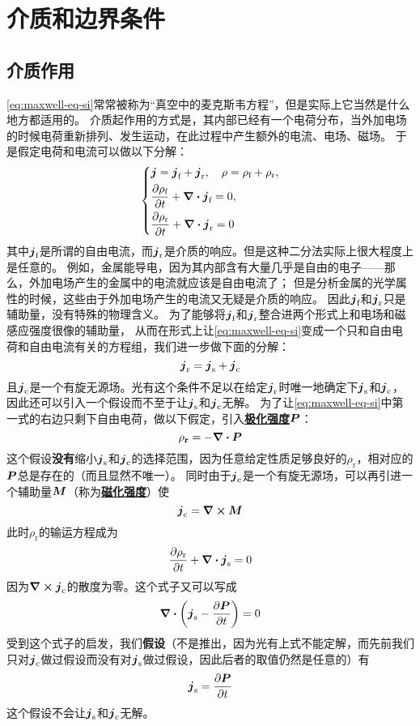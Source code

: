 \documentclass[UTF8, a4paper]{ctexart}
\renewcommand{\emph}[1]{\textbf{#1}}
\newcommand*{\concept}[1]{\underline{\textbf{#1}}}
\begin{document}
\section{介质和边界条件}

\subsection{介质作用}

\eqref{eq:maxwell-eq-si}常常被称为“真空中的麦克斯韦方程”，但是实际上它当然是什么地方都适用的。
介质起作用的方式是，其内部已经有一个电荷分布，当外加电场的时候电荷重新排列、发生运动，在此过程中产生额外的电流、电场、磁场。
于是假定电荷和电流可以做以下分解：
\[
    \left\{
        \begin{aligned}
            &\vb*{j} = \vb*{j}_\text{f} + \vb*{j}_\text{r}, \quad \rho = \rho_\text{f} + \rho_\text{r}, \\
            &\pdv{\rho_\text{f}}{t} + \div{\vb*{j}_\text{f}} = 0, \\
            &\pdv{\rho_\text{r}}{t} + \div{\vb*{j}_\text{r}} = 0
        \end{aligned}
    \right.
\]
其中$\vb*{j}_\text{f}$是所谓的自由电流，而$\vb*{j}_\text{r}$是介质的响应。但是这种二分法实际上很大程度上是任意的。
例如，金属能导电，因为其内部含有大量几乎是自由的电子——那么，外加电场产生的金属中的电流就应该是自由电流了；
但是分析金属的光学属性的时候，这些由于外加电场产生的电流又无疑是介质的响应。
因此$\vb*{j}_\text{f}$和$\vb*{j}_\text{r}$只是辅助量，没有特殊的物理含义。
为了能够将$\vb*{j}_\text{f}$和$\vb*{j}_\text{r}$整合进两个形式上和电场和磁感应强度很像的辅助量，
从而在形式上让\eqref{eq:maxwell-eq-si}变成一个只和自由电荷和自由电流有关的方程组，我们进一步做下面的分解：
\[
    \vb*{j}_\text{r} = \vb*{j}_\text{s} + \vb*{j}_\text{c}
\]
且$\vb*{j}_\text{c}$是一个有旋无源场。光有这个条件不足以在给定$\vb*{j}_\text{r}$时唯一地确定下$\vb*{j}_\text{s}$和$\vb*{j}_\text{c}$，
因此还可以引入一个假设而不至于让$\vb*{j}_\text{s}$和$\vb*{j}_\text{c}$无解。
为了让\eqref{eq:maxwell-eq-si}中第一式的右边只剩下自由电荷，做以下假定，引入\concept{极化强度}$\vb*{P}$：
\[
    \rho_\textbf{r} = - \div{\vb*{P}}
\]
这个假设\emph{没有}缩小$\vb*{j}_\text{s}$和$\vb*{j}_\text{c}$的选择范围，因为任意给定性质足够良好的$\rho_\text{r}$，相对应的$\vb*{P}$总是存在的（而且显然不唯一）。
同时由于$\vb*{j}_\text{c}$是一个有旋无源场，可以再引进一个辅助量$\vb*{M}$（称为\concept{磁化强度}）使
\[
    \vb*{j}_\text{c} = \curl{\vb*{M}}
\]
此时$\rho_\text{r}$的输运方程成为
\[
    \pdv{\rho_\text{r}}{t} + \div{\vb*{j}_\text{s}} = 0
\]
因为$\curl{\vb*{j}_\text{c}}$的散度为零。这个式子又可以写成
\[
    \div{\left(\vb*{j}_\text{s}-\pdv{\vb*{P}}{t}\right)} = 0
\]
受到这个式子的启发，我们\emph{假设}（不是推出，因为光有上式不能定解，而先前我们只对$\vb*{j}_\text{c}$做过假设而没有对$\vb*{j}_\text{s}$做过假设，因此后者的取值仍然是任意的）有
\[
    \vb*{j}_\text{s} = \pdv{\vb*{P}}{t}
\]
这个假设不会让$\vb*{j}_\text{s}$和$\vb*{j}_\text{c}$无解。
\end{document}
